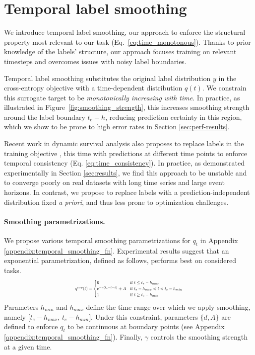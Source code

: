 \documentclass[nohyperref]{article}
\begin{document}
\section{Temporal label smoothing}\label{sec:TLS} 

We introduce temporal label smoothing, our approach to enforce the structural property most relevant to our task (Eq.~\ref{eq:time_monotonous}). Thanks to prior knowledge of the labels' structure, our approach focuses training on relevant timesteps and overcomes issues with noisy label boundaries. 

Temporal label smoothing substitutes the original label distribution $y$ in the cross-entropy objective with a time-dependent distribution $q(t)$. We constrain this surrogate target to be \textit{monotonically increasing with time}. In practice, as illustrated in Figure~\ref{fig:smoothing_strength}, this increases smoothing strength around the label boundary $t_e - h $, reducing prediction certainty in this region, which we show to be prone to high error rates in Section \ref{sec:perf-results}.

Recent work in dynamic survival analysis also proposes to replace labels in the training objective \citep{Maystre2022}, this time with predictions at different time points to enforce temporal consistency (Eq. \ref{eq:time_consistency}). In practice, as demonstrated experimentally in Section \ref{sec:results}, we find this approach to be unstable and to converge poorly on real datasets with long time series and large event horizons. In contrast, we propose to replace labels with a prediction-independent distribution fixed \textit{a priori}, and thus less prone to optimization challenges. 

\paragraph{Smoothing parametrizations.} We propose various temporal smoothing parametrizations for $q_{t}$ in Appendix \ref{appendix:temporal_smoothing_fn}. Experimental results suggest that an exponential parametrization, defined as follows, performs best on considered tasks. \begin{equation*}
\resizebox{0.45\textwidth}{!}{$
    q^{exp}(t)  = \begin{cases}
    0 & \text{if }  t \leq t_e - h_{max} \\
    e^{ - \gamma ( t_e - t - d) } + A & \text{if } t_e - h_{max} < t < t_e - h_{min} \\ 
    1 & \text{if }   t \geq t_e - h_{min}
    
    \end{cases}$}
\end{equation*}
Parameters $h_{min}$ and $h_{max}$ define the time range over which we apply smoothing, namely $[t_e - h_{max}$, $t_e - h_{min}]$. Under this constraint, parameters $\{d, A\}$ are defined to enforce $q_{t}$ to be continuous at boundary points (see Appendix \ref{appendix:temporal_smoothing_fn}). Finally, $\gamma$ controls the smoothing strength at a given time. 
\end{document}
